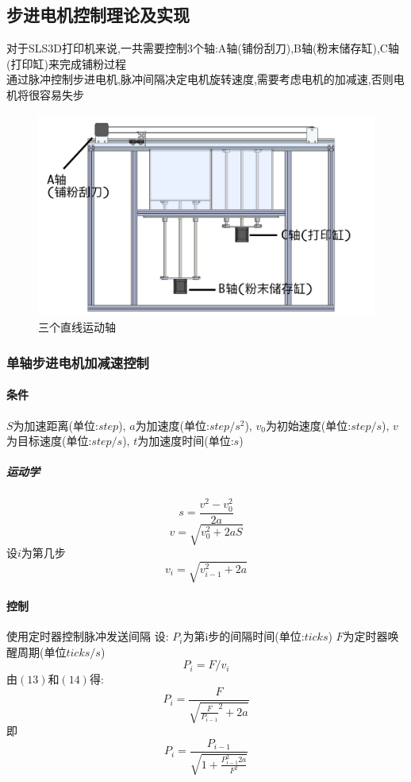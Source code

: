 \documentclass[a4paper,12pt,onecolumn,twoside]{article}
\begin{document}
\subsection{步进电机控制理论及实现}
对于SLS3D打印机来说,一共需要控制3个轴:A轴(铺份刮刀),B轴(粉末储存缸),C轴(打印缸)来完成铺粉过程\\
通过脉冲控制步进电机,脉冲间隔决定电机旋转速度,需要考虑电机的加减速,否则电机将很容易失步
\begin{figure}[ht]
\centering     
\includegraphics[width=\linewidth]{stepper.png}
\caption{三个直线运动轴}
\end{figure}
\subsubsection{单轴步进电机加减速控制}
\paragraph{条件}
$S$为加速距离(单位:$step$),
$a$为加速度(单位:$step/s^2$),
$v_0$为初始速度(单位:$step/s$),
$v$为目标速度(单位:$step/s$),	
$t$为加速度时间(单位:$s$)
\subparagraph{运动学}{
}
\begin{equation}
s=\frac{v^2-v_0^2}{2a}
\end{equation}
\begin{equation}
v=\sqrt{v_0^2+2aS}
\end{equation}
设$i$为第几步
\begin{equation}
v_i=\sqrt{v_{i-1}^2+2a}
\end{equation}
\paragraph{控制}
使用定时器控制脉冲发送间隔 设:
$P_i$为第i步的间隔时间(单位:$ticks$)
$F$为定时器唤醒周期(单位$ticks/s$)
\begin{equation}
P_i=F/v_i 
\end{equation}
由$(13)$和$(14)$得:
\begin{equation}
P_i=\frac{F}{\sqrt{\frac{F}{P_{i-1}}^2+2a}}
\end{equation}
即
\begin{equation}
P_i=\frac{P_{i-1}}{\sqrt{1+\frac{P_{i-1}^2 2 a}{F^2}}}
\end{equation}
\end{document}
